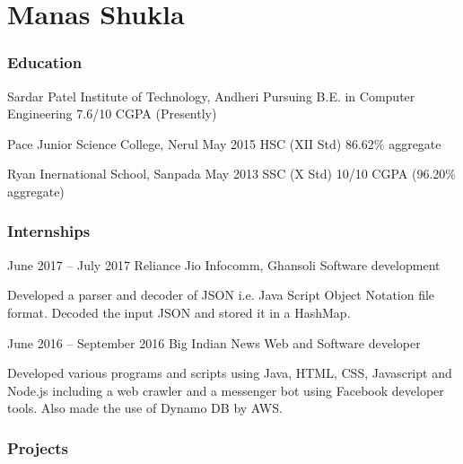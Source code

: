 \documentclass{tccv}
\begin{document}
\part{Manas Shukla}

\section{Education}

\begin{yearlist}
\item[Sardar Patel Institute of Technology, Andheri]{Pursuing}
     {B.E. in Computer Engineering}
     {7.6/10 CGPA (Presently)}

\item[Pace Junior Science College, Nerul]{May 2015}
     {HSC (XII Std)}
     {86.62\% aggregate}

\item[Ryan Inernational School, Sanpada]{May 2013}
     {SSC (X Std)}
     {10/10 CGPA (96.20\% aggregate)}
     
     

\end{yearlist}

\section{Internships}

\begin{eventlist}

\item{June 2017 -- July 2017}
     {Reliance Jio Infocomm, Ghansoli}
     {Software development}

Developed a parser and decoder of JSON
i.e. Java Script Object Notation 
file format. Decoded the input JSON and
stored it in a HashMap.

\item{June 2016 -- September 2016}
     {Big Indian News}
     {Web and Software developer}

Developed various programs and scripts using Java, HTML, CSS,
Javascript and Node.js including a web crawler and a messenger bot 
using Facebook developer tools. Also made the use of Dynamo DB by AWS.

\end{eventlist}

\section{Projects}
\end{document}
